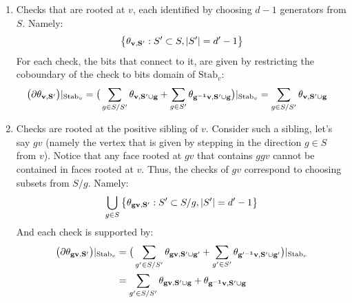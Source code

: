 \begin{enumerate}
  \item Checks that are rooted at $v$, each identified by choosing $d-1$ generators from $S$. Namely: 
    \begin{equation*}
      \begin{split}
        \big\{ \mathbf{\theta_{v ,S^{\prime}}{} }{}: S^{\prime} \subset S , |S^{\prime}|=d^{\prime}-1  \big\} 
      \end{split}
    \end{equation*}
    For each check, the bits that connect to it, are given by restricting the coboundary of the check to bits domain of $\text{Stab}_{v}$:  
    \begin{equation*}
      \begin{split}
       \big( \partial \mathbf{\theta_{v ,S^{\prime}}{} }{} \big)|_{\text{Stab}_{v}} & =  \big(   \sum_{g \in S/S^{\prime}} \mathbf{\theta_{v ,S^{\prime} \cup g} } + \sum_{g \in S^{\prime}} \mathbf{\theta_{g^{-1}v ,S^{\prime}\cup g} }  \big)|_{\text{Stab}_{v}} =     \sum_{g \in S/S^{\prime}} \mathbf{\theta_{v ,S^{\prime} \cup g} } 
      \end{split}
    \end{equation*}
  \item Checks are rooted at the positive sibling of $v$. Consider such a sibling, let's say $gv$ (namely the vertex that is given by stepping in the direction $g \in S$ from $v$). Notice that any face rooted at $gv$ that contains $ggv$ cannot be contained in faces rooted at $v$. Thus, the checks of $gv$ correspond to choosing subsets from $S/g$. Namely:
    \begin{equation*}
      \begin{split}
      \bigcup_{g \in S}\big\{ \mathbf{\theta_{gv ,S^{\prime}} }: S^{\prime} \subset S/g , |S^{\prime}|=d^{\prime}-1  \big\}
      \end{split}
    \end{equation*}
    And each check is supported by:
    \begin{equation*}
      \begin{split}
        \big( \partial \mathbf{\theta_{gv ,S^{\prime}} } \big)|_{\text{Stab}_{v}} & = 
        \big(   \sum_{g^{\prime} \in S/S^{\prime}} \mathbf{\theta_{gv ,S^{\prime} \cup g^{\prime}} } + \sum_{g^{\prime} \in S^{\prime}} \mathbf{\theta_{g^{\prime -1}v ,S^{\prime}\cup g^{\prime}} } \big)|_{\text{Stab}_{v}} \\
        &  =    \sum_{g^{\prime} \in S/S^{\prime}} \mathbf{\theta_{g v ,S^{\prime} \cup g} } + \mathbf{\theta_{g^{-1}v ,S^{\prime}\cup g} }
      \end{split}
    \end{equation*}

\end{enumerate}
